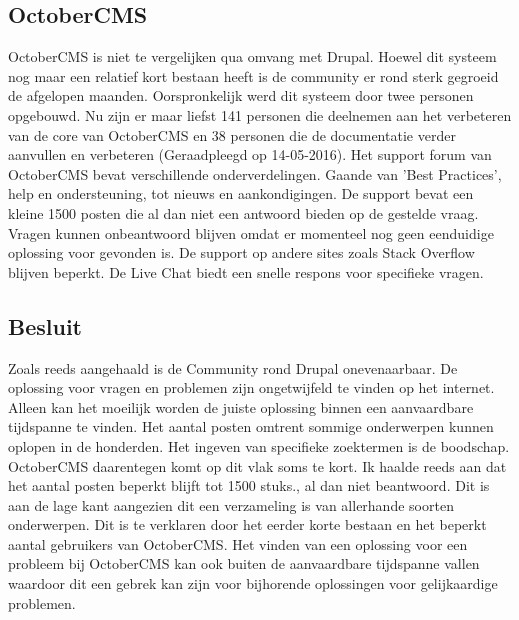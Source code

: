 \subsection{OctoberCMS}
OctoberCMS is niet te vergelijken qua omvang met Drupal. Hoewel dit systeem nog maar een relatief kort bestaan heeft is de community er rond sterk gegroeid de afgelopen maanden. Oorspronkelijk werd dit systeem door twee personen opgebouwd. Nu zijn er maar liefst 141 personen die deelnemen aan het verbeteren van de core van OctoberCMS \citep{OctoberCMS2016OctoberCMSGithub} en 38 personen die de documentatie verder aanvullen en verbeteren \citep{OctoberCMS2016OctoberCMSDocumentation} (Geraadpleegd op 14-05-2016).
\newline\newline
Het support forum van OctoberCMS bevat verschillende onderverdelingen. Gaande van 'Best Practices', help en ondersteuning, tot nieuws en aankondigingen. De support bevat een kleine 1500 posten die al dan niet een antwoord bieden op de gestelde vraag. Vragen kunnen onbeantwoord blijven omdat er momenteel nog geen eenduidige oplossing voor gevonden is. De support op andere sites zoals Stack Overflow blijven beperkt. De Live Chat biedt een snelle respons voor specifieke vragen. 

\subsection{Besluit}
Zoals reeds aangehaald is de Community rond Drupal onevenaarbaar. De oplossing voor vragen en problemen zijn ongetwijfeld te vinden op het internet. Alleen kan het moeilijk worden de juiste oplossing binnen een aanvaardbare tijdspanne te vinden. Het aantal posten omtrent sommige onderwerpen kunnen oplopen in de honderden. Het ingeven van specifieke zoektermen is de boodschap. OctoberCMS daarentegen komt op dit vlak soms te kort. Ik haalde reeds aan dat het aantal posten beperkt blijft tot 1500 stuks., al dan niet beantwoord. Dit is aan de lage kant aangezien dit een verzameling is van allerhande soorten onderwerpen. Dit is te verklaren door het eerder korte bestaan en het beperkt aantal gebruikers van OctoberCMS. Het vinden van een oplossing voor een probleem bij OctoberCMS kan ook buiten de aanvaardbare tijdspanne vallen waardoor dit een gebrek kan zijn voor bijhorende oplossingen voor gelijkaardige problemen.


